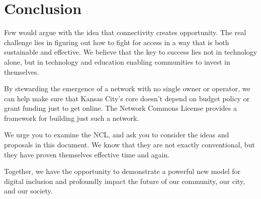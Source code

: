 \section{Conclusion}
Few would argue with the idea that connectivity creates opportunity. The 
real challenge lies in figuring out how to fight for access in a way 
that is both sustainable and effective. We believe that the key to 
success lies not in technology alone, but in technology and education 
enabling communities to invest in themselves. \par

By stewarding the emergence of a network with no single owner or operator, 
we can help make sure that Kansas City's core doesn't depend
on budget policy or grant funding just to get online. The Network
Commons License provides a framework for building just such a network. \par

We urge you to examine the NCL, and ask you to consider the ideas and
proposals in this document. We know that they are not exactly
conventional, but they have proven themselves effective time and again. \par

Together, we have the opportunity to demonstrate a powerful new model
for digital inclusion and profoundly impact the future of our community,
our city, and our society. \par
